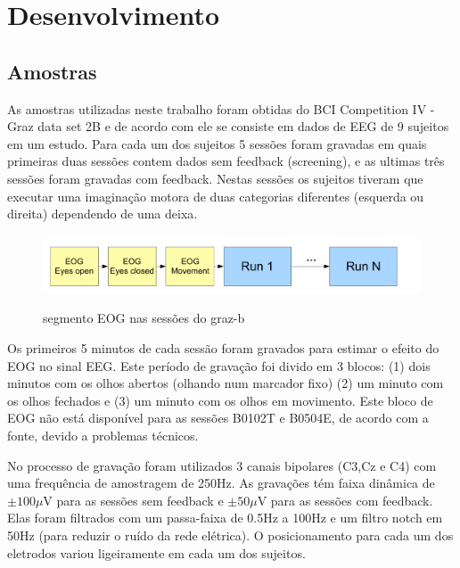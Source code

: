 \chapter{Desenvolvimento} \label{lab_desenvolvimento}

\section{Amostras}
\par
As amostras utilizadas neste trabalho foram obtidas do BCI Competition IV - Graz data set 2B e de acordo com \cite{GrazBData}
 ele se consiste em dados de \ac{EEG} de 9 sujeitos em um estudo.
 Para cada um dos sujeitos 5 sess\~oes foram gravadas em quais primeiras duas sess\~oes contem dados sem feedback (screening), e as ultimas tr\^es sess\~oes foram gravadas com feedback. Nestas sess\~oes os sujeitos tiveram que executar uma imagina\c{c}\~ao motora de duas categorias diferentes (esquerda ou direita) dependendo de uma deixa. 
 \begin{figure}[h!]
 	\caption{segmento EOG nas sess\~oes do graz-b} 	
 	\centering
 	\includegraphics[scale=0.5]{./figuras/graz-eog}
 	\label{fig:Graz-EOG}
 \end{figure}
 \par 
 Os primeiros 5 minutos de cada sess\~ao foram gravados para estimar o efeito do \ac{EOG} no sinal \ac{EEG}.
 Este per\'iodo de grava\c{c}\~ao foi divido em 3 blocos: (1) dois minutos com os olhos abertos (olhando num marcador fixo) (2) um minuto com os olhos fechados e (3) um minuto com os olhos em movimento.
 Este bloco de \ac{EOG} n\~ao est\'a dispon\'ivel para as sess\~oes   B0102T e B0504E, de acordo com a fonte, devido a problemas t\'ecnicos.
 \par
  No processo de grava\c{c}\~ao foram utilizados 3 canais bipolares (C3,Cz e C4) com uma frequ\^encia de amostragem de 250Hz.
 As grava\c{c}\~oes t\'em faixa din\^amica de $\pm 100 \mu$V para as sess\~oes sem feedback e $\pm 50 \mu$V para as sess\~oes com feedback. Elas foram filtrados com um passa-faixa de 0.5Hz a 100Hz e um filtro notch em 50Hz (para reduzir o ru\'ido da rede el\'etrica). O posicionamento para cada um dos eletrodos variou ligeiramente em cada um dos sujeitos.
